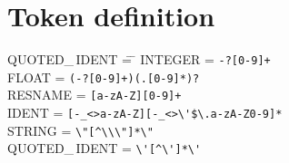 \documentclass[11pt]{article}
\begin{document}
\newpage
\section{Token definition}
\label{app:tokens}

\begin{tabbing}
  QUOTED\_\,IDENT \= = \/ \= \kill
  INTEGER \> = \> \verb|-?[0-9]+| \\
  FLOAT \> = \> \verb|(-?[0-9]+)(.[0-9]*)?| \\
  RESNAME \> = \> \verb|[a-zA-Z][0-9]+| \\
  IDENT \> = \> \verb|[-_<>a-zA-Z][-_<>\'$\.a-zA-Z0-9]*| \\
  STRING \> = \> \verb|\"[^\\\"]*\"| \\
  QUOTED\_\,IDENT \> = \> \verb|\'[^\']*\'| \\
\end{tabbing}
\end{document}
